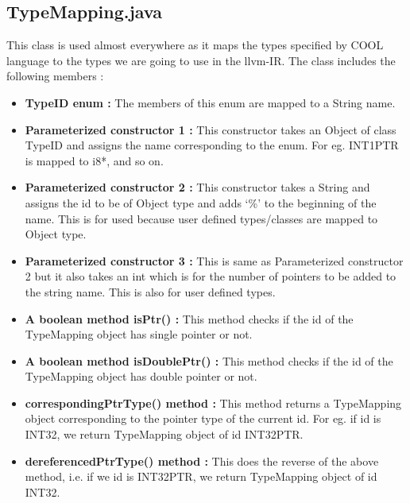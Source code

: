 \documentclass{article}
\begin{document}

\subsection{TypeMapping.java}
This class is used almost everywhere as it maps the types specified by COOL language to the types we are going to use in the llvm-IR. The class includes the following members :
\\
\begin{itemize}

    \item \textbf{TypeID enum :} The members of this enum are mapped to a String name.
    \item \textbf{Parameterized constructor 1 :} This constructor takes an Object of class TypeID and assigns the name corresponding to the enum. For eg. INT1PTR is mapped to i8*, and so on.
    \item \textbf{Parameterized constructor 2 :} This constructor takes a String and assigns the id to be of Object type and adds ‘\%’ to the beginning of the name. This is for used because user defined types/classes are mapped to Object type.
    \item \textbf{Parameterized constructor 3 :}  This is same as Parameterized constructor 2 but it also takes an int which is for the number of pointers to be added to the string name. This is also for user defined types.
    \item \textbf{A boolean method isPtr() :} This method checks if the id of the TypeMapping object has single pointer or not.
    \item \textbf{A boolean method isDoublePtr() :} This method checks if the id of the TypeMapping object has double pointer or not.
    \item \textbf{correspondingPtrType() method :} This method returns a TypeMapping object corresponding to the pointer type of the current id. For eg. if id is INT32, we return TypeMapping object of id INT32PTR.
    \item \textbf{dereferencedPtrType() method :} This does the reverse of the above method, i.e. if we id is INT32PTR, we return TypeMapping object of id INT32.
   
\end{itemize}
\end{document}
